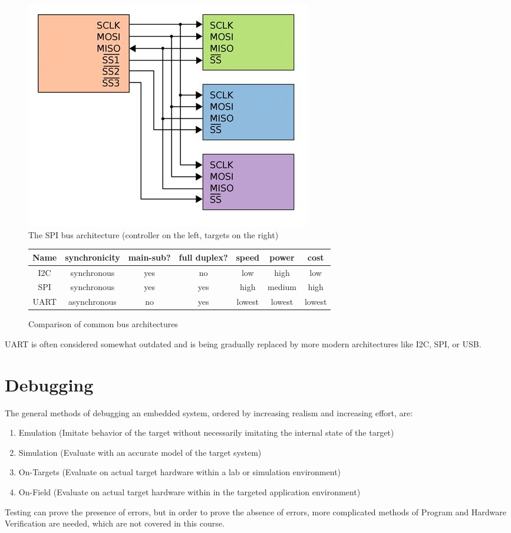\documentclass{report}
\begin{document}
\begin{figure}[h!]
\centering
\includegraphics[scale=1.5]{figures/SPI.png}
\caption{The SPI bus architecture (controller on the left, targets on the right)}
\label{fig:DeltaPWM}
\end{figure}
\begin{figure}[h!]
\centering
\begin{tabular}[h!]{|c|cccccc|}
\hline
Name & synchronicity & main-sub? & full duplex? & speed & power & cost\\\hline
I2C & synchronous & yes & no & low & high & low\\
SPI & synchronous & yes & yes & high & medium & high\\
UART & asynchronous & no & yes & lowest & lowest & lowest\\
\hline
\end{tabular}
\caption{Comparison of common bus architectures}
\end{figure}
UART is often considered somewhat outdated and is being gradually replaced by more modern architectures like I2C, SPI, or USB.
%
\section{Debugging}
The general methods of debugging an embedded system, ordered by increasing realism and increasing effort, are:
\begin{enumerate}
 \item Emulation (Imitate behavior of the target without necessarily imitating the internal state of the target)
 \item Simulation (Evaluate with an accurate model of the target system)
 \item On-Targets (Evaluate on actual target hardware within a lab or simulation environment)
 \item On-Field (Evaluate on actual target hardware within in the targeted application environment)
\end{enumerate}
Testing can prove the presence of errors, but in order to prove the absence of errors, more complicated methods of Program and Hardware Verification are needed, which are not covered in this course.
%
\end{document}
